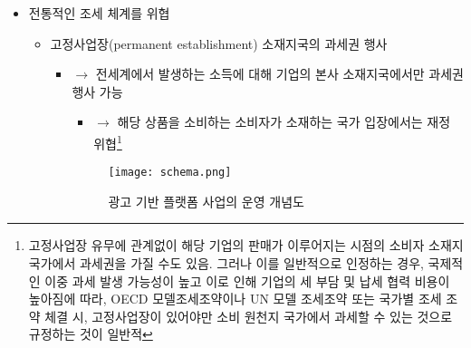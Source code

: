 \begin{itemize}
\begin{itemize}
	\item 소득의 원천이 되는 국가에 물리적 고정 사업장을 두지 않고, 사법 경계를 가로질러 대단위 경제 활동이 가능 \footnote{다국적 기업을 생각해보면, 디지털 플랫폼 사업자의 고유한 특성은 아님}
	\item 소프트웨어와 알고리듬 등 지적재산권을 포함한 무형 자산에 크게 의존\footnote{지적재산권이 중요한 수입원이 되는 것 또한 디지털 플랫폼 사업자의 고유한 특성은 아님}
	\item 데이터, 사용자 참여 등은 지적재산권과 함께 시너지(synergy) 효과를 냄 $\rightarrow$ 부가가치를 만드는 주체가 사용자가 됨\footnote{사용자 참여를 서비스 사용에 대한 대가로 보는 입장도 있음. 이러한 입장에서는 사용자가 생산한 데이터에 대해 소득세 부과가 가능하다고 주장하게 됨. 물론 수동적인 소비자가 다수일 수 있다는 점 그리고 화폐로 환산하기로 어려운 소비자 참여가 있다는 점도 있음}
	\end{itemize}	
\item 전통적인 조세 체계를 위협
	\begin{itemize}
	\item 고정사업장(permanent establishment) 소재지국의 과세권 행사
		\begin{itemize}
		\item $\rightarrow$ 전세계에서 발생하는 소득에 대해 기업의 본사 소재지국에서만 과세권 행사 가능
			\begin{itemize}
			\item $\rightarrow$ 해당 상품을 소비하는 소비자가 소재하는 국가 입장에서는 재정 위협\footnote{고정사업장 유무에 관계없이 해당 기업의 판매가 이루어지는 시점의 소비자 소재지 국가에서 과세권을 가질 수도 있음. 그러나 이를 일반적으로 인정하는 경우, 국제적인 이중 과세 발생 가능성이 높고 이로 인해 기업의 세 부담 및 납세 협력 비용이 높아짐에 따라, OECD 모델조세조약이나 UN 모델 조세조약 또는 국가별 조세 조약 체결 시, 고정사업장이 있어야만 소비 원천지 국가에서 과세할 수 있는 것으로 규정하는 것이 일반적}
			\end{itemize}
			
				\begin{figure}[htbp]
				\begin{center}
				\texttt{[image: schema.png]}
				\caption{광고 기반 플랫폼 사업의 운영 개념도}
				\label{fig:schema}
				\end{center}
				\end{figure}		
			

\end{itemize}
\end{itemize}
\end{itemize}
